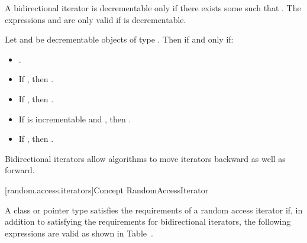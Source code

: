 
\begin{addedblock}
\pnum
A bidirectional iterator  is decrementable only if there exists some  such that
. The expressions  and  are only valid if  is
decrementable.

\pnum
Let  and  be decrementable objects of type . Then    if and only if:

\begin{itemize}
\item {}.
\item If , then .
\item If , then .
\item If  is incrementable and , then
      .
\item If , then .
\end{itemize}
\end{addedblock}

\begin{removedblock}
\pnum
\enternote
Bidirectional iterators allow algorithms to move iterators backward as well as forward.
\exitnote
\end{removedblock}

[random.access.iterators]{Concept RandomAccessIterator}

\begin{removedblock}
\pnum
A class or pointer type
satisfies the requirements of a random access iterator if,
in addition to satisfying the requirements for bidirectional iterators,
the following expressions are valid as shown in Table~.
\end{removedblock}

